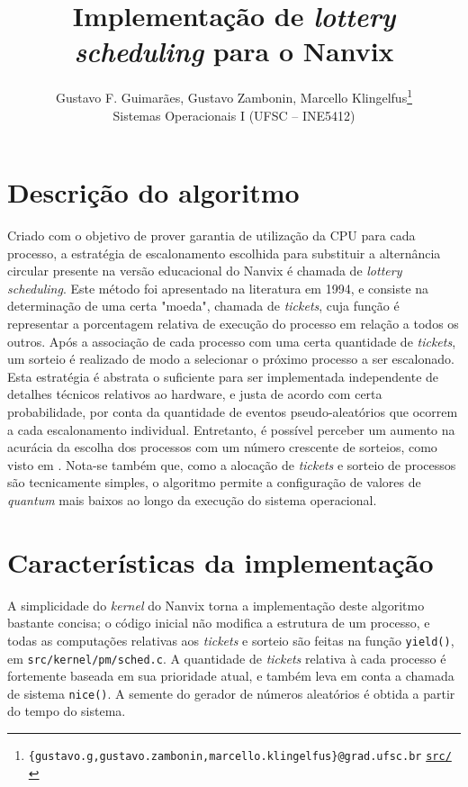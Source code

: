 \documentclass[12pt]{article}
\title{\textbf{Implementação de \emph{lottery scheduling} para o Nanvix}}
\author{
  Gustavo F. Guimarães, Gustavo Zambonin, Marcello Klingelfus\thanks{
    \texttt{\{gustavo.g,gustavo.zambonin,marcello.klingelfus\}@grad.ufsc.br}
    \hfill \texttt{\href{https://github.com/zambonin/nanvix}{src/}}
  } \\
  \small{Sistemas Operacionais I (UFSC -- INE5412)}
}
\date{}
\begin{document}
\maketitle

\section{Descrição do algoritmo}

Criado com o objetivo de prover garantia de utilização da CPU para cada
processo, a estratégia de escalonamento escolhida para substituir a alternância
circular presente na versão educacional do Nanvix é chamada de \emph{lottery
scheduling}. Este método foi apresentado na literatura em 1994, e consiste na
determinação de uma certa "moeda", chamada de \emph{tickets}, cuja função é
representar a porcentagem relativa de execução do processo em relação a todos
os outros. Após a associação de cada processo com uma certa quantidade de
\emph{tickets}, um sorteio é realizado de modo a selecionar o próximo processo
a ser escalonado. \\

Esta estratégia é abstrata o suficiente para ser implementada independente de
detalhes técnicos relativos ao hardware, e justa de acordo com certa
probabilidade, por conta da quantidade de eventos pseudo-aleatórios que ocorrem
a cada escalonamento individual. Entretanto, é possível perceber um aumento
na acurácia da escolha dos processos com um número crescente de sorteios,
como visto em \cite[seção 2.2]{Waldspurger:1994:LSF:1267638.1267639}. Nota-se
também que, como a alocação de \emph{tickets} e sorteio de processos são
tecnicamente simples, o algoritmo permite a configuração de valores de
\emph{quantum} mais baixos ao longo da execução do sistema operacional.

\section{Características da implementação}

A simplicidade do \emph{kernel} do Nanvix torna a implementação deste algoritmo
bastante concisa; o código inicial não modifica a estrutura de um processo, e
todas as computações relativas aos \emph{tickets} e sorteio são feitas na
função \texttt{yield()}, em \texttt{src/kernel/pm/sched.c}. A quantidade de
\emph{tickets} relativa à cada processo é fortemente baseada em sua prioridade
atual, e também leva em conta a chamada de sistema \texttt{nice()}. A semente
do gerador de números aleatórios é obtida a partir do tempo do sistema. \\
\end{document}
